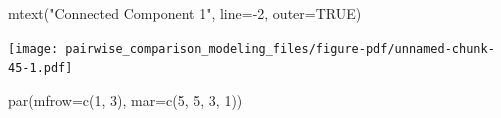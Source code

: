 \documentclass[
  letterpaper,
  DIV=11,
  numbers=noendperiod]{scrartcl}
\newenvironment{Shaded}{\begin{snugshade}}{\end{snugshade}}
\newcommand{\AttributeTok}[1]{\textcolor[rgb]{0.40,0.45,0.13}{#1}}
\newcommand{\ConstantTok}[1]{\textcolor[rgb]{0.56,0.35,0.01}{#1}}
\newcommand{\DecValTok}[1]{\textcolor[rgb]{0.68,0.00,0.00}{#1}}
\newcommand{\FunctionTok}[1]{\textcolor[rgb]{0.28,0.35,0.67}{#1}}
\newcommand{\NormalTok}[1]{\textcolor[rgb]{0.00,0.23,0.31}{#1}}
\newcommand{\SpecialCharTok}[1]{\textcolor[rgb]{0.37,0.37,0.37}{#1}}
\newcommand{\StringTok}[1]{\textcolor[rgb]{0.13,0.47,0.30}{#1}}
\begin{document}
\begin{Shaded}
\begin{Highlighting}[]
\FunctionTok{mtext}\NormalTok{(}\StringTok{"Connected Component 1"}\NormalTok{, }\AttributeTok{line=}\SpecialCharTok{{-}}\DecValTok{2}\NormalTok{, }\AttributeTok{outer=}\ConstantTok{TRUE}\NormalTok{)}
\end{Highlighting}
\end{Shaded}

\texttt{[image: pairwise\_comparison\_modeling\_files/figure-pdf/unnamed-chunk-45-1.pdf]}

\begin{Shaded}
\begin{Highlighting}[]
\FunctionTok{par}\NormalTok{(}\AttributeTok{mfrow=}\FunctionTok{c}\NormalTok{(}\DecValTok{1}\NormalTok{, }\DecValTok{3}\NormalTok{), }\AttributeTok{mar=}\FunctionTok{c}\NormalTok{(}\DecValTok{5}\NormalTok{, }\DecValTok{5}\NormalTok{, }\DecValTok{3}\NormalTok{, }\DecValTok{1}\NormalTok{))}


\end{Highlighting}
\end{Shaded}
\end{document}
